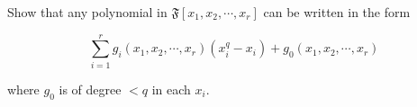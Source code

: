 Show that any polynomial in $\mathfrak{F}[x_1, x_2, \cdots, x_r]$ can be written in the form

$$\sum_{i=1}^{r} g_i(x_1, x_2, \cdots, x_r)(x_i^q - x_i) + g_0(x_1, x_2, \cdots, x_r)$$

where $g_0$ is of degree $< q$ in each $x_i$.